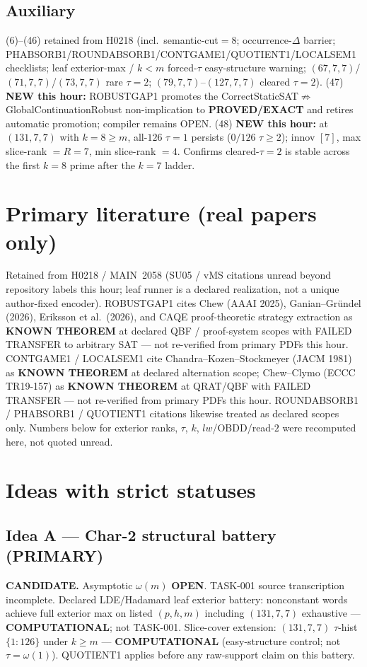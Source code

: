 \documentclass[11pt]{article}
\begin{document}
\subsection*{Auxiliary}
(6)--(46) retained from H0218 (incl.\ semantic-cut$=8$; occurrence-$\Delta$ barrier;
PHABSORB1/ROUNDABSORB1/CONTGAME1/QUOTIENT1/LOCALSEM1 checklists; leaf exterior-max / $k{<}m$ forced-$\tau$ easy-structure warning;
$(67,7,7)$/$(71,7,7)$/$(73,7,7)$ rare $\tau{=}2$; $(79,7,7)$--$(127,7,7)$ cleared $\tau{=}2$).
(47) \textbf{NEW this hour:} ROBUSTGAP1 promotes the CorrectStaticSAT$\not\Rightarrow$GlobalContinuationRobust
non-implication to \textbf{PROVED/EXACT} and retires automatic promotion; compiler remains OPEN.
(48) \textbf{NEW this hour:} at $(131,7,7)$ with $k{=}8{\ge}m$, all-$126$ $\tau{=}1$ persists
($0/126$ $\tau{\ge}2$); innov $[7]$, max slice-rank $=R{=}7$, min slice-rank $=4$.
Confirms cleared-$\tau{=}2$ is stable across the first $k{=}8$ prime after the $k{=}7$ ladder.

\section*{Primary literature (real papers only)}
Retained from H0218 / MAIN~2058 (SU05 / vMS citations unread beyond repository labels this hour;
leaf runner is a declared realization, not a unique author-fixed encoder).
ROBUSTGAP1 cites Chew (AAAI 2025), Ganian--Gr\"undel (2026), Eriksson et al.\ (2026),
and CAQE proof-theoretic strategy extraction as \textbf{KNOWN THEOREM} at declared QBF /
proof-system scopes with FAILED TRANSFER to arbitrary SAT --- not re-verified from primary
PDFs this hour.
CONTGAME1 / LOCALSEM1 cite Chandra--Kozen--Stockmeyer (JACM 1981) as \textbf{KNOWN THEOREM}
at declared alternation scope; Chew--Clymo (ECCC TR19-157) as \textbf{KNOWN THEOREM} at
QRAT/QBF with FAILED TRANSFER --- not re-verified from primary PDFs this hour.
ROUNDABSORB1 / PHABSORB1 / QUOTIENT1 citations likewise treated as declared scopes only.
Numbers below for exterior ranks, $\tau$, $k$, $lw$/OBDD/read-$2$
were recomputed here, not quoted unread.

\section*{Ideas with strict statuses}
\subsection*{Idea A --- Char-2 structural battery (PRIMARY)}
\textbf{CANDIDATE.} Asymptotic $\omega(m)$ \textbf{OPEN}. TASK-001 source transcription incomplete.
Declared LDE/Hadamard leaf exterior battery: nonconstant words achieve full exterior max on
listed $(p,h,m)$ including $(131,7,7)$ exhaustive --- \textbf{COMPUTATIONAL}; not TASK-001.
Slice-cover extension: $(131,7,7)$ $\tau$-hist $\{1{:}126\}$ under $k{\ge}m$ ---
\textbf{COMPUTATIONAL} (easy-structure control; not $\tau=\omega(1)$).
QUOTIENT1 applies before any raw-support claim on this battery.
\end{document}
